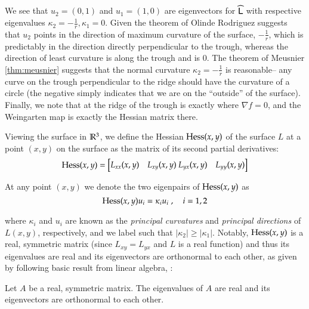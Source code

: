   We see that $u_2 = (0,1)$ and $u_1 = (1,0)$ are eigenvectors for $\widehat{\mathsf{L}}$ with respective eigenvalues
  $\kappa_2 = -\frac{1}{r} , \kappa_1 = 0$. Given the theorem of Olinde Rodriguez suggests that $u_2$ points in the direction of maximum curvature of the surface, $-\frac{1}{r}$, which is predictably in the direction directly perpendicular to the trough, whereas the direction of least curvature is along the trough and is $0$. The theorem of Meusnier \cref{thm:meusnier} suggests that the normal curvature $\kappa_2 = -\frac{1}{r}$ is reasonable-- any curve on the trough perpendicular to the ridge should have the curvature of a circle (the negative simply indicates that we are on the ``outside'' of the surface). Finally, we note that at the ridge of the trough is exactly where $\nabla f = 0$, and the Weingarten map is exactly the Hessian matrix there.
  
  Viewing the surface in $\mathbb{R}^3$, we define the Hessian  $\mathrm{Hess}(x,y)$ of the surface $L$
  at a point $(x,y)$ on the surface as the matrix of its second partial derivatives:
  \begin{equation}
  \mathrm{Hess}(x,y) = \begin{bmatrix}
  L_{xx}(x,y) & L_{xy}(x,y) \
  L_{yx}(x,y) & L_{yy}(x,y)
  \end{bmatrix}
  \end{equation}
  
  At any point $(x,y)$ we denote the two eigenpairs of $\mathrm{Hess}(x,y)$ as
  \begin{equation}
  \mathrm{Hess}(x,y) u_i = \kappa_i u_i \; , \quad i = 1,2
  \end{equation}
  
  where $\kappa_i$ and $u_i$ are known as the
  \textit{principal curvatures} and \textit{principal directions}  of $L(x,y)$, respectively, and we label such that $|\kappa_2| \ge |\kappa_1|$. Notably, $\mathrm{Hess}(x,y)$ is a real, symmetric matrix (since  $L_{xy} = L_{yx}$ and $L$ is a real function) and thus its eigenvalues are real and its eigenvectors are orthonormal to each other, as given by following basic result from linear algebra,
  \cite{burden-faires}:
  
  \begin{lemma}
     	Let $A$ be a real, symmetric matrix. The eigenvalues of $A$ are real and its eigenvectors are orthonormal to each other.
  \end{lemma}
  
